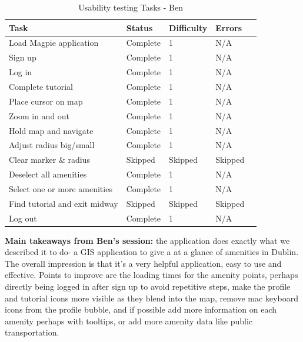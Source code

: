 \begin{table}[h!]
  \centering
  \caption{Usability testing Tasks - Ben}
  \begin{tabular}{|p{}|p{}|p{}|p{}|p{}|}
    \hline
    \textbf{Task}                 & \textbf{Status} & \textbf{Difficulty} & \textbf{Errors} \\
    \hline
    Load Magpie application       & Complete        & 1                   & N/A             \\
    \hline
    Sign up                       & Complete        & 1                   & N/A             \\
    \hline
    Log in                        & Complete        & 1                   & N/A             \\
    \hline
    Complete tutorial             & Complete        & 1                   & N/A             \\
    \hline
    Place cursor on map           & Complete        & 1                   & N/A             \\
    \hline
    Zoom in and out               & Complete        & 1                   & N/A             \\
    \hline
    Hold map and navigate         & Complete        & 1                   & N/A             \\
    \hline
    Adjust radius big/small       & Complete        & 1                   & N/A             \\
    \hline
    Clear marker \& radius        & Skipped         & Skipped             & Skipped         \\
    \hline
    Deselect all amenities        & Complete        & 1                   & N/A             \\
    \hline
    Select one or more amenities  & Complete        & 1                   & N/A             \\
    \hline
    Find tutorial and exit midway & Skipped         & Skipped             & Skipped         \\
    \hline
    Log out                       & Complete        & 1                   & N/A             \\
    \hline
  \end{tabular}
\end{table}

\noindent\textbf{Main takeaways from Ben's session: }the application does
exactly what we described it to do- a GIS application to give a at a glance of
amenities in Dublin. The overall impression is that it's a very helpful
application, easy to use and effective. Points to improve are the loading times
for the amenity points, perhaps directly being logged in after sign up to avoid
repetitive steps, make the profile and tutorial icons more visible as they blend
into the map, remove mac keyboard icons from the profile bubble, and if possible
add more information on each amenity perhaps with tooltips, or add more amenity
data like public transportation.

